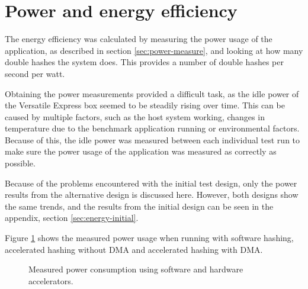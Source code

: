 \section{Power and energy efficiency}

The energy efficiency was calculated by measuring the power usage of the application, as described in section \ref{sec:power-measure},
and looking at how many double hashes the system does. This provides a number of double hashes per second per watt.

Obtaining the power measurements provided a difficult task, as the idle power of the Versatile Express box seemed to be
steadily rising over time. This can be caused by multiple factors, such as the host system working, changes in temperature
due to the benchmark application running or environmental factors. Because of this, the idle power was measured between
each individual test run to make sure the power usage of the application was measured as correctly as possible.

Because of the problems encountered with the initial test design, only the power results from the alternative design
is discussed here. However, both designs show the same trends, and the results from the initial design can be seen in
the appendix, section \ref{sec:energy-initial}.

Figure \ref{fig:power-plot} shows the measured power usage when running with software hashing, accelerated hashing without DMA
and accelerated hashing with DMA.

\begin{figure}
	\centering
	\caption{Measured power consumption using software and hardware accelerators.}
	\label{fig:power-plot}
\end{figure}

